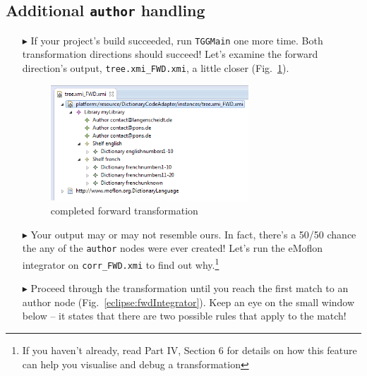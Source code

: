 \newpage
\hypertarget{t2m close}{}
\subsection{Additional \texttt{author} handling}
\genHeader

\begin{itemize}

\item[$\blacktriangleright$] If your project's build succeeded, run \texttt{TGGMain} one more time. Both transformation directions should succeed! Let's examine
the forward direction's output,  \texttt{tree.xmi\_FWD.xmi}, a little closer (Fig.~\ref{eclipse:generatedFwdTrsfm}).

\vspace{0.5cm}

\begin{figure}[htbp]
\begin{center}
  \includegraphics[width=0.7\textwidth]{eclipse_generatedForwardTransformation}
  \caption{completed forward transformation}
  \label{eclipse:generatedFwdTrsfm}
\end{center}
\end{figure}

\vspace{0.5cm}

\item[$\blacktriangleright$] Your output may or may not resemble ours. In fact, there's a 50/50 chance the any of the \texttt{author} nodes were ever created!
Let's run the eMoflon integrator on \texttt{corr\_FWD.xmi} to find out why.\footnote{If you haven't already, read Part IV, Section 6 for details on how this feature
can help you visualise and debug a transformation}

\vspace{0.5cm}

\item[$\blacktriangleright$] Proceed through the transformation until you reach the first match to an author node (Fig.~\ref{eclipse:fwdIntegrator}). Keep an
eye on the small window below -- it states that there are two possible rules that apply to the match!


\end{itemize}

